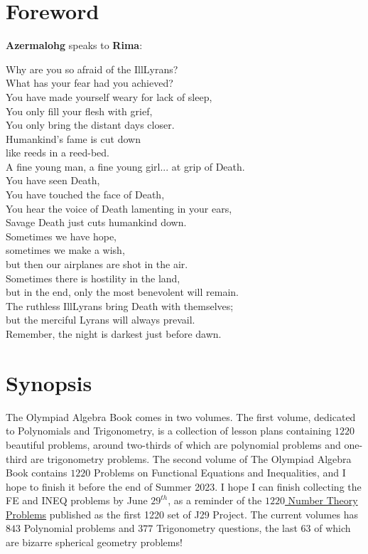 \documentclass[12pt,a4paper]{memoir}
\theoremstyle{definition}
\begin{document}
\section*{Foreword}
\textbf{Azermalohg} speaks to \textbf{Rima}:
\begin{displayquote}
	Why are you so afraid of the IllLyrans?\\
	What has your fear had you achieved?\\
	You have made yourself weary for lack of sleep,\\
	You only fill your flesh with grief,\\
	You only bring the distant days closer.\\
	Humankind's fame is cut down\\
	like reeds in a reed-bed.\\
	A fine young man, a fine young girl... at grip of Death.\\
	You have seen Death,\\
	You have touched the face of Death,\\
	You hear the voice of Death lamenting in your ears,\\
	Savage Death just cuts humankind down.\\
	Sometimes we have hope,\\
	sometimes we make a wish,\\
	but then our airplanes are shot in the air.\\
	Sometimes there is hostility in the land,\\
	but in the end, only the most benevolent will remain.\\
	The ruthless IllLyrans bring Death with themselves;\\
	but the merciful Lyrans will always prevail.\\
	Remember, the night is darkest just before dawn.
\end{displayquote}


\newpage

\section*{Synopsis}
The Olympiad Algebra Book comes in two volumes. The first volume, dedicated to Polynomials and Trigonometry, is a collection of lesson plans containing $1220$ beautiful problems, around two-thirds of which are polynomial problems and one-third are trigonometry problems. The second volume of The Olympiad Algebra Book contains $1220$ Problems on Functional Equations and Inequalities, and I hope to finish it before the end of Summer 2023. I hope I can finish collecting the FE and INEQ problems by June $29^{th}$, as a reminder of the \href{https://www.academia.edu/29934442/1220_Number_Theory_Problems_J29_Project}{$1220$ Number Theory Problems} published as the first 1220 set of J29 Project. The current volumes has $843$ Polynomial problems and $377$ Trigonometry questions, the last $63$ of which are bizarre spherical geometry problems!
\end{document}

